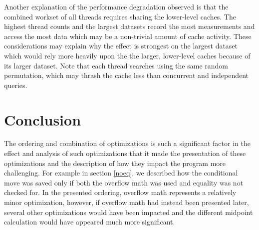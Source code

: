 \documentclass[twocolumn]{article}
\begin{document}
Another explanation of the performance degradation observed is that the combined workset of all threads requires sharing the lower-level caches. The highest thread counts and the largest datasets record the most measurements and access the most data which may be a non-trivial amount of cache activity. These considerations may explain why the effect is strongest on the largest dataset which would rely more heavily upon the the larger, lower-level caches because of its larger dataset. Note that each thread searches using the same random permutation, which may thrash the cache less than concurrent and independent queries.

\begin{figure}[t]
\end{figure}

\section{Conclusion}
The ordering and combination of optimizations is such a significant factor in the effect and analysis of such optimizations that it made the presentation of these optimizations and the description of how they impact the program more challenging. For example in section \ref{noeq}, we described how the conditional move was saved only if both the overflow math was used and equality was not checked for. In the presented ordering, overflow math represents a relatively minor optimization, however, if overflow math had instead been presented later, several other optimizations would have been impacted and the different midpoint calculation would have appeared much more significant.
\end{document}
